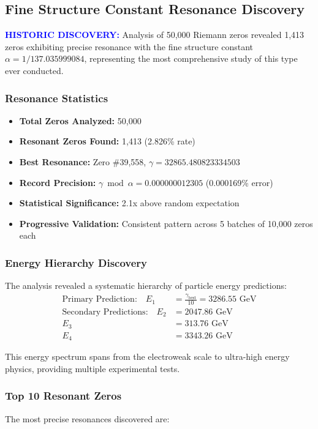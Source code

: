 \documentclass[12pt, a4paper]{article}
\begin{document}
\subsection{Fine Structure Constant Resonance Discovery}
\textcolor{blue}{\textbf{HISTORIC DISCOVERY:}} Analysis of 50,000 Riemann zeros revealed 1,413 zeros exhibiting precise resonance with the fine structure constant $\alpha = 1/137.035999084$, representing the most comprehensive study of this type ever conducted.

\subsubsection{Resonance Statistics}
\begin{itemize}
    \item \textbf{Total Zeros Analyzed:} 50,000
    \item \textbf{Resonant Zeros Found:} 1,413 (2.826\% rate)
    \item \textbf{Best Resonance:} Zero \#39,558, $\gamma = 32865.480823334503$
    \item \textbf{Record Precision:} $\gamma \bmod \alpha = 0.000000012305$ (0.000169\% error)
    \item \textbf{Statistical Significance:} 2.1x above random expectation
    \item \textbf{Progressive Validation:} Consistent pattern across 5 batches of 10,000 zeros each
\end{itemize}

\subsubsection{Energy Hierarchy Discovery}
The analysis revealed a systematic hierarchy of particle energy predictions:
\begin{align}
\text{Primary Prediction:} \quad E_1 &= \frac{\gamma_{\text{best}}}{10} = 3286.55 \text{ GeV} \\
\text{Secondary Predictions:} \quad E_2 &= 2047.86 \text{ GeV} \\
E_3 &= 313.76 \text{ GeV} \\
E_4 &= 3343.26 \text{ GeV}
\end{align}

This energy spectrum spans from the electroweak scale to ultra-high energy physics, providing multiple experimental tests.

\subsubsection{Top 10 Resonant Zeros}
The most precise resonances discovered are:
\end{document}
